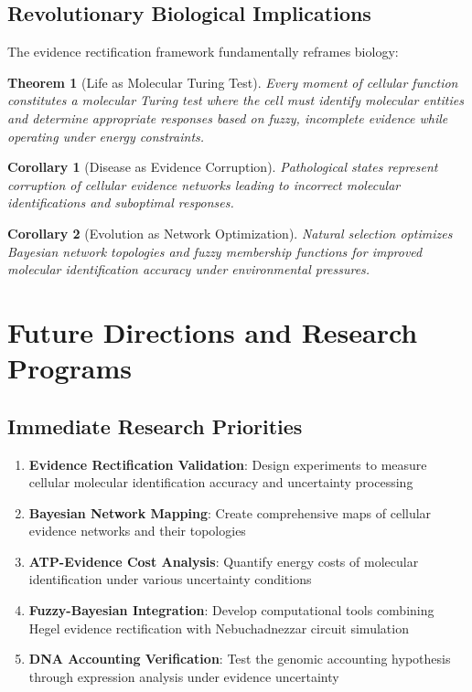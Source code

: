 \documentclass[12pt,a4paper]{article}
\newtheorem{theorem}{Theorem}
\newtheorem{corollary}{Corollary}
\begin{document}
\subsection{Revolutionary Biological Implications}

The evidence rectification framework fundamentally reframes biology:

\begin{theorem}[Life as Molecular Turing Test]
Every moment of cellular function constitutes a molecular Turing test where the cell must identify molecular entities and determine appropriate responses based on fuzzy, incomplete evidence while operating under energy constraints.
\end{theorem}

\begin{corollary}[Disease as Evidence Corruption]
Pathological states represent corruption of cellular evidence networks leading to incorrect molecular identifications and suboptimal responses.
\end{corollary}

\begin{corollary}[Evolution as Network Optimization]
Natural selection optimizes Bayesian network topologies and fuzzy membership functions for improved molecular identification accuracy under environmental pressures.
\end{corollary}

\section{Future Directions and Research Programs}

\subsection{Immediate Research Priorities}

\begin{enumerate}
\item \textbf{Evidence Rectification Validation}: Design experiments to measure cellular molecular identification accuracy and uncertainty processing
\item \textbf{Bayesian Network Mapping}: Create comprehensive maps of cellular evidence networks and their topologies
\item \textbf{ATP-Evidence Cost Analysis}: Quantify energy costs of molecular identification under various uncertainty conditions
\item \textbf{Fuzzy-Bayesian Integration}: Develop computational tools combining Hegel evidence rectification with Nebuchadnezzar circuit simulation
\item \textbf{DNA Accounting Verification}: Test the genomic accounting hypothesis through expression analysis under evidence uncertainty
\end{enumerate}
\end{document}
